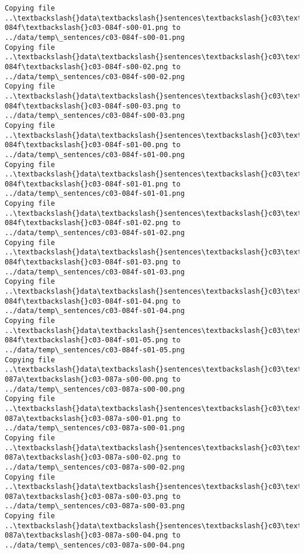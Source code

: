 \documentclass[11pt]{article}
\begin{document}
\begin{Verbatim}[commandchars=\\\{\}]
Copying file ..\textbackslash{}data\textbackslash{}sentences\textbackslash{}c03\textbackslash{}c03-084f\textbackslash{}c03-084f-s00-01.png to
../data/temp\_sentences/c03-084f-s00-01.png
Copying file ..\textbackslash{}data\textbackslash{}sentences\textbackslash{}c03\textbackslash{}c03-084f\textbackslash{}c03-084f-s00-02.png to
../data/temp\_sentences/c03-084f-s00-02.png
Copying file ..\textbackslash{}data\textbackslash{}sentences\textbackslash{}c03\textbackslash{}c03-084f\textbackslash{}c03-084f-s00-03.png to
../data/temp\_sentences/c03-084f-s00-03.png
Copying file ..\textbackslash{}data\textbackslash{}sentences\textbackslash{}c03\textbackslash{}c03-084f\textbackslash{}c03-084f-s01-00.png to
../data/temp\_sentences/c03-084f-s01-00.png
Copying file ..\textbackslash{}data\textbackslash{}sentences\textbackslash{}c03\textbackslash{}c03-084f\textbackslash{}c03-084f-s01-01.png to
../data/temp\_sentences/c03-084f-s01-01.png
Copying file ..\textbackslash{}data\textbackslash{}sentences\textbackslash{}c03\textbackslash{}c03-084f\textbackslash{}c03-084f-s01-02.png to
../data/temp\_sentences/c03-084f-s01-02.png
Copying file ..\textbackslash{}data\textbackslash{}sentences\textbackslash{}c03\textbackslash{}c03-084f\textbackslash{}c03-084f-s01-03.png to
../data/temp\_sentences/c03-084f-s01-03.png
Copying file ..\textbackslash{}data\textbackslash{}sentences\textbackslash{}c03\textbackslash{}c03-084f\textbackslash{}c03-084f-s01-04.png to
../data/temp\_sentences/c03-084f-s01-04.png
Copying file ..\textbackslash{}data\textbackslash{}sentences\textbackslash{}c03\textbackslash{}c03-084f\textbackslash{}c03-084f-s01-05.png to
../data/temp\_sentences/c03-084f-s01-05.png
Copying file ..\textbackslash{}data\textbackslash{}sentences\textbackslash{}c03\textbackslash{}c03-087a\textbackslash{}c03-087a-s00-00.png to
../data/temp\_sentences/c03-087a-s00-00.png
Copying file ..\textbackslash{}data\textbackslash{}sentences\textbackslash{}c03\textbackslash{}c03-087a\textbackslash{}c03-087a-s00-01.png to
../data/temp\_sentences/c03-087a-s00-01.png
Copying file ..\textbackslash{}data\textbackslash{}sentences\textbackslash{}c03\textbackslash{}c03-087a\textbackslash{}c03-087a-s00-02.png to
../data/temp\_sentences/c03-087a-s00-02.png
Copying file ..\textbackslash{}data\textbackslash{}sentences\textbackslash{}c03\textbackslash{}c03-087a\textbackslash{}c03-087a-s00-03.png to
../data/temp\_sentences/c03-087a-s00-03.png
Copying file ..\textbackslash{}data\textbackslash{}sentences\textbackslash{}c03\textbackslash{}c03-087a\textbackslash{}c03-087a-s00-04.png to
../data/temp\_sentences/c03-087a-s00-04.png

\end{Verbatim}
\end{document}
